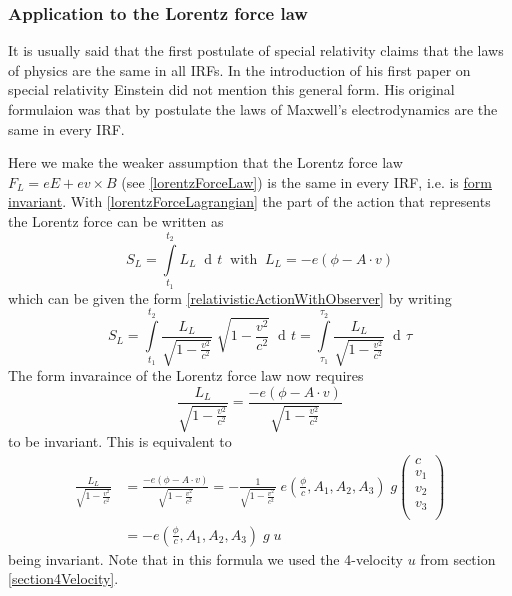 \documentclass{article}
\DeclareMathOperator{\dd}{d\!}
\begin{document}
\subsubsection{Application to the Lorentz force law} \label{sectionConsequencesOfInvarianceLorentzForce}
It is usually said that the first postulate of special relativity claims that the laws of physics are the same in all IRFs.
In the introduction of his first paper on special relativity \cite{EinsteinSpecialRelativity} Einstein did not mention this general form.
His original formulaion was that by postulate the laws of Maxwell's electrodynamics are the same in every IRF.

Here we make the weaker assumption that the Lorentz force law $F_L = eE + ev \times B$ (see \ref{lorentzForceLaw}) is the same in every IRF, i.e. is \hyperlink{hrefDefintionFormInvariance}{form invariant}.
With \ref{lorentzForceLagrangian} the part of the action that represents the Lorentz force can be written as
\begin{equation}
    S_L = \int\limits_{t_1}^{t_2} L_L \; \dd t \;\; \text{with} \;\; L_L = - e (\phi - A \cdot v)
\end{equation}
which can be given the form \ref{relativisticActionWithObserver} by writing
\begin{equation}
    S_L = \int\limits_{t_1}^{t_2} \frac{L_L}{\sqrt{1-\frac{v^2}{c^2}}} \; \sqrt{1-\frac{v^2}{c^2}} \; \dd t
        = \int\limits_{\tau_1}^{\tau_2} \frac{L_L}{\sqrt{1-\frac{v^2}{c^2}}} \;  \dd \tau
\end{equation}
The form invaraince of the Lorentz force law now requires
\begin{equation}
    \frac{L_L}{\sqrt{1-\frac{v^2}{c^2}}} = \frac{- e (\phi - A \cdot v)}{\sqrt{1-\frac{v^2}{c^2}}}
\end{equation}
to be invariant.
This is equivalent to
\begin{align}
    \frac{L_L}{\sqrt{1-\frac{v^2}{c^2}}} &= \frac{- e (\phi - A \cdot v)}{\sqrt{1-\frac{v^2}{c^2}}}  = - \frac{1}{\sqrt{1-\frac{v^2}{c^2}}} \; e (\frac{\phi}{c} , A_1, A_2, A_3) \; g
    \left(\begin{array}{c}
      c \\
      v_1\\
      v_2\\
      v_3\\
    \end{array} \right) \nonumber \\
    &= - e (\frac{\phi}{c} , A_1, A_2, A_3) \; g \; u \label{invariantLorentzForceLagrangian}
\end{align}
being invariant.
Note that in this formula we used the 4-velocity $u$ from section \ref{section4Velocity}.
\end{document}
